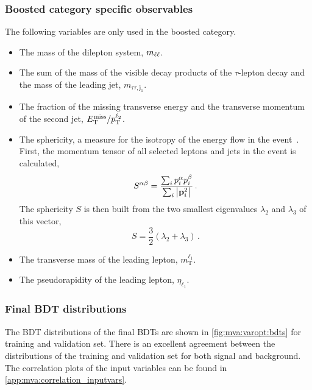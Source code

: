 \subsubsection{Boosted category specific observables}
The following variables are only used in the boosted category.
\begin{itemize}
    \item The mass of the dilepton system, $m_{\ell\ell}$.
    \item The sum of the mass of the visible decay products of the $\tau$-lepton decay and the mass of the leading jet, $m_{\tau\tau,\text{j}_1} $.
    \item The fraction of the missing transverse energy and the transverse momentum of the second jet, $E_\text{T}^\text{miss} / p_\text{T}^{\ell_2}$.
    \item The sphericity, a measure for the isotropy of the energy flow in the event~\cite{Sphericity}.
          First, the momentum tensor of all selected leptons and jets in the event is calculated,
          \begin{equation}
              S^{\alpha\beta} = \frac{\sum_i p_i^\alpha p_i^\beta}{\sum_i \left|\mathbf{p}_i^2\right|} \,.
          \end{equation}
          The sphericity $S$ is then built from the two smallest eigenvalues $\lambda_2$ and $\lambda_3$ of this vector,
          \begin{equation}
              S = \frac{3}{2} \left( \lambda_2 + \lambda_3 \right) \,.
          \end{equation}
    \item The transverse mass of the leading lepton, $m_\text{T}^{\ell_1}$.
    \item The pseudorapidity of the leading lepton, $\eta_{\ell_1}$.
\end{itemize}


\subsubsection{Final BDT distributions}

The BDT distributions of the final BDTs are shown in \cref{fig:mva:varopt:bdts} for training and validation set.
There is an excellent agreement between the distributions of the training and validation set for both signal and background.
The correlation plots of the input variables can be found in \cref{app:mva:correlation_inputvars}.

